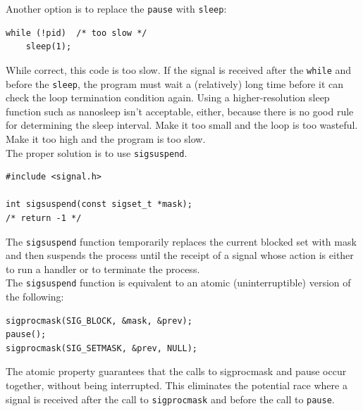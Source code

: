 \documentclass[11pt]{article}
\begin{document}
Another option is to replace the \texttt{pause} with \texttt{sleep}:\\
\begin{verbatim}
while (!pid)  /* too slow */
    sleep(1);
\end{verbatim}
While correct, this code is too slow. If the signal is received after the \texttt{while} and before the \texttt{sleep}, the program must wait a (relatively) long time before it can check the loop termination condition again. Using a higher-resolution sleep function such as nanosleep isn’t acceptable, either, because there is no good rule for determining the sleep interval. Make it too small and the loop is too wasteful. Make it too high and the program is too slow.\\


The proper solution is to use \texttt{sigsuspend}.\\
\begin{verbatim}
#include <signal.h>

int sigsuspend(const sigset_t *mask);
/* return -1 */
\end{verbatim}
The \texttt{sigsuspend} function temporarily replaces the current blocked set with mask and then suspends the process until the receipt of a signal whose action is either to run a handler or to terminate the process.\\


The \texttt{sigsuspend} function is equivalent to an atomic (uninterruptible) version of the following:\\
\begin{verbatim}
sigprocmask(SIG_BLOCK, &mask, &prev);
pause();
sigprocmask(SIG_SETMASK, &prev, NULL);
\end{verbatim}
The atomic property guarantees that the calls to sigprocmask and pause occur together, without being interrupted. This eliminates the potential race where a signal is received after the call to \texttt{sigprocmask} and before the call to \texttt{pause}.\\
\end{document}
